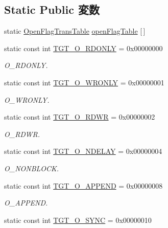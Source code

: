 \subsection*{Static Public 変数}
\begin{DoxyCompactItemize}
\item 
static \hyperlink{structOpenFlagTransTable}{OpenFlagTransTable} \hyperlink{classSparcSolaris_ab1db5a531609b99b262cc849ea24765a}{openFlagTable} \mbox{[}$\,$\mbox{]}
\item 
static const int \hyperlink{classSparcSolaris_ad266b23a0ae07d1833e18bae651f3411}{TGT\_\-O\_\-RDONLY} = 0x00000000
\begin{DoxyCompactList}\small\item\em O\_\-RDONLY. \item\end{DoxyCompactList}\item 
static const int \hyperlink{classSparcSolaris_a6156c069cefe05ce3cce033b2e0c2de2}{TGT\_\-O\_\-WRONLY} = 0x00000001
\begin{DoxyCompactList}\small\item\em O\_\-WRONLY. \item\end{DoxyCompactList}\item 
static const int \hyperlink{classSparcSolaris_ac6fa9ecf5d2f3314f197698f1099e2ac}{TGT\_\-O\_\-RDWR} = 0x00000002
\begin{DoxyCompactList}\small\item\em O\_\-RDWR. \item\end{DoxyCompactList}\item 
static const int \hyperlink{classSparcSolaris_ac13381222e564483ac5408b9fac7c60f}{TGT\_\-O\_\-NDELAY} = 0x00000004
\begin{DoxyCompactList}\small\item\em O\_\-NONBLOCK. \item\end{DoxyCompactList}\item 
static const int \hyperlink{classSparcSolaris_af11adc5404ea3780a5ce2829cc3710b7}{TGT\_\-O\_\-APPEND} = 0x00000008
\begin{DoxyCompactList}\small\item\em O\_\-APPEND. \item\end{DoxyCompactList}\item 
static const int \hyperlink{classSparcSolaris_abf43ab05d2a5b6b8113952160d8565db}{TGT\_\-O\_\-SYNC} = 0x00000010

\end{DoxyCompactItemize}
